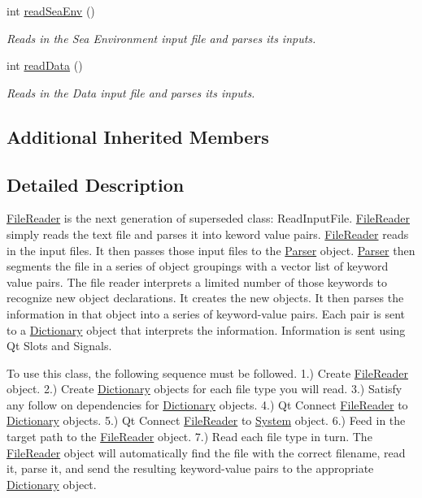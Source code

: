 \begin{DoxyCompactItemize}
int \hyperlink{class_file_reader_a1f8a6bd4b5c53f80cc94d64d6dd1f2da}{read\-Sea\-Env} ()
\begin{DoxyCompactList}\small\item\em Reads in the Sea Environment input file and parses its inputs. \end{DoxyCompactList}\item 
int \hyperlink{class_file_reader_a814f8b06adcc190d4042509797eef6d2}{read\-Data} ()
\begin{DoxyCompactList}\small\item\em Reads in the Data input file and parses its inputs. \end{DoxyCompactList}\end{DoxyCompactItemize}
\subsection*{Additional Inherited Members}


\subsection{Detailed Description}
\hyperlink{class_file_reader}{File\-Reader} is the next generation of superseded class\-: Read\-Input\-File. \hyperlink{class_file_reader}{File\-Reader} simply reads the text file and parses it into keword value pairs. \hyperlink{class_file_reader}{File\-Reader} reads in the input files. It then passes those input files to the \hyperlink{class_parser}{Parser} object. \hyperlink{class_parser}{Parser} then segments the file in a series of object groupings with a vector list of keyword value pairs. The file reader interprets a limited number of those keywords to recognize new object declarations. It creates the new objects. It then parses the information in that object into a series of keyword-\/value pairs. Each pair is sent to a \hyperlink{class_dictionary}{Dictionary} object that interprets the information. Information is sent using Qt Slots and Signals.

To use this class, the following sequence must be followed. 1.) Create \hyperlink{class_file_reader}{File\-Reader} object. 2.) Create \hyperlink{class_dictionary}{Dictionary} objects for each file type you will read. 3.) Satisfy any follow on dependencies for \hyperlink{class_dictionary}{Dictionary} objects. 4.) Qt Connect \hyperlink{class_file_reader}{File\-Reader} to \hyperlink{class_dictionary}{Dictionary} objects. 5.) Qt Connect \hyperlink{class_file_reader}{File\-Reader} to \hyperlink{class_system}{System} object. 6.) Feed in the target path to the \hyperlink{class_file_reader}{File\-Reader} object. 7.) Read each file type in turn. The \hyperlink{class_file_reader}{File\-Reader} object will automatically find the file with the correct filename, read it, parse it, and send the resulting keyword-\/value pairs to the appropriate \hyperlink{class_dictionary}{Dictionary} object. 

